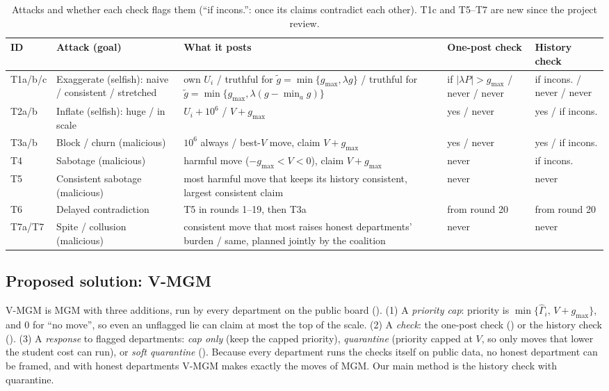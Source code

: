 \documentclass{article}
\theoremstyle{definition}
\newcommand{\1}{\mathbf{1}}
\newcommand{\gmax}{g_{\max}}
\begin{document}
\begin{table}[!t]
\caption{Attacks and whether each check flags them (``if incons.'': once its claims contradict each other). T1c and T5--T7 are new since the project review.}
\label{tab:attacks}
\centering\scriptsize
\setlength{\tabcolsep}{4pt}\begin{tabularx}{\linewidth}{@{}>{\raggedright\arraybackslash}p{0.95cm}>{\raggedright\arraybackslash}p{3.6cm}X>{\raggedright\arraybackslash}p{2.1cm}>{\raggedright\arraybackslash}p{1.9cm}@{}}
\toprule
ID & Attack (goal) & What it posts & One-post check & History check \\
\midrule
T1a/b/c & Exaggerate (selfish): naive / consistent / stretched & own $U_i$ / truthful for $\tilde g=\min\{\gmax,\lambda g\}$ / truthful for $\tilde g=\min\{\gmax,\lambda(g-\min_a g)\}$ & if $|\lambda P|>\gmax$ / never / never & if incons. / never / never \\
T2a/b & Inflate (selfish): huge / in scale & $U_i+10^6$ / $V+\gmax$ & yes / never & yes / if incons. \\
T3a/b & Block / churn (malicious) & $10^6$ always / best-$V$ move, claim $V+\gmax$ & yes / never & yes / if incons. \\
T4 & Sabotage (malicious) & harmful move ($-\gmax<V<0$), claim $V+\gmax$ & never & if incons. \\
T5 & Consistent sabotage (malicious) & most harmful move that keeps its history consistent, largest consistent claim & never & never \\
T6 & Delayed contradiction & T5 in rounds 1--19, then T3a & from round 20 & from round 20 \\
T7a/T7 & Spite / collusion (malicious) & consistent move that most raises honest departments' burden / same, planned jointly by the coalition & never & never \\
\bottomrule
\end{tabularx}
\end{table}

\subsection{Proposed solution: V-MGM}
\label{sec:vmgm}
V-MGM is MGM with three additions, run by every department on the public board (). (1) A \emph{priority cap}: priority is $\min\{\hat\Gamma_i,\,V+\gmax\}$, and $0$ for ``no move'', so even an unflagged lie can claim at most the top of the scale. (2) A \emph{check}: the one-post check () or the history check (). (3) A \emph{response} to flagged departments: \emph{cap only} (keep the capped priority), \emph{quarantine} (priority capped at $V$, so only moves that lower the student cost can run), or \emph{soft quarantine} (). Because every department runs the checks itself on public data, no honest department can be framed, and with honest departments V-MGM makes exactly the moves of MGM. Our main method is the history check with quarantine.
\end{document}
